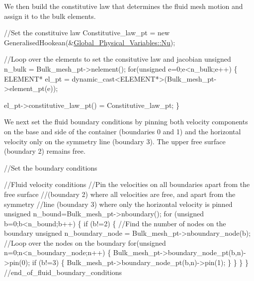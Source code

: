 We then build the constitutive law that determines the fluid mesh motion and assign it to the bulk elements.


\begin{DoxyCodeInclude}

 \textcolor{comment}{//Set the constituive law}
 Constitutive\_law\_pt = 
  \textcolor{keyword}{new} GeneralisedHookean(&\hyperlink{namespaceGlobal__Physical__Variables_a3962c36313826b19f216f6bbbdd6a477}{Global\_Physical\_Variables::Nu});
 
 \textcolor{comment}{//Loop over the elements to set the consitutive law and jacobian}
 \textcolor{keywordtype}{unsigned} n\_bulk = Bulk\_mesh\_pt->nelement();
 \textcolor{keywordflow}{for}(\textcolor{keywordtype}{unsigned} e=0;e<n\_bulk;e++)
  \{
   ELEMENT* el\_pt = 
   \textcolor{keyword}{dynamic\_cast<}ELEMENT*\textcolor{keyword}{>}(Bulk\_mesh\_pt->element\_pt(e));
   
   el\_pt->constitutive\_law\_pt() = Constitutive\_law\_pt;
  \}

\end{DoxyCodeInclude}


We next set the fluid boundary conditions by pinning both velocity components on the base and side of the container (boundaries 0 and 1) and the horizontal velocity only on the symmetry line (boundary 3). The upper free surface (boundary 2) remains free.


\begin{DoxyCodeInclude}

 \textcolor{comment}{//Set the boundary conditions}

 \textcolor{comment}{//Fluid velocity conditions}
 \textcolor{comment}{//Pin the velocities on all boundaries apart from the free surface}
 \textcolor{comment}{//(boundary 2) where all velocities are free, and apart from the symmetry}
 \textcolor{comment}{//line (boundary 3) where only the horizontal velocity is pinned}
 \textcolor{keywordtype}{unsigned} n\_bound=Bulk\_mesh\_pt->nboundary();
 \textcolor{keywordflow}{for} (\textcolor{keywordtype}{unsigned} b=0;b<n\_bound;b++)
  \{
   \textcolor{keywordflow}{if} (b!=2)
    \{
     \textcolor{comment}{//Find the number of nodes on the boundary}
     \textcolor{keywordtype}{unsigned} n\_boundary\_node = Bulk\_mesh\_pt->nboundary\_node(b);
     \textcolor{comment}{//Loop over the nodes on the boundary}
     \textcolor{keywordflow}{for}(\textcolor{keywordtype}{unsigned} n=0;n<n\_boundary\_node;n++)
      \{
       Bulk\_mesh\_pt->boundary\_node\_pt(b,n)->pin(0);
       \textcolor{keywordflow}{if} (b!=3)
        \{
         Bulk\_mesh\_pt->boundary\_node\_pt(b,n)->pin(1);
        \}
      \}
    \}
  \} \textcolor{comment}{//end\_of\_fluid\_boundary\_conditions}

\end{DoxyCodeInclude}


